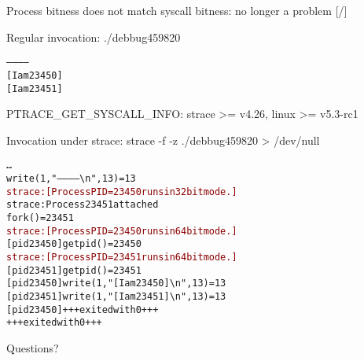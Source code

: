 \documentclass[unicode,aspectratio=169,xcolor={table,dvipsnames,usernames}]{beamer}
\begin{document}
\begin{frame}[fragile]{Process bitness does not match syscall bitness: no longer a problem \hfill [\insertframenumber/\inserttotalframenumber]}
\large
{}

\begin{block}{Regular invocation: ./debbug459820}
\begin{alltt}
------------
[I am 23450]
[I am 23451]
\end{alltt}
\end{block}
\end{frame}

\begin{frame}[fragile]{PTRACE\_GET\_SYSCALL\_INFO: strace >= v4.26, linux >= v5.3-rc1}
\large
\begin{block}{Invocation under strace: strace -f -z ./debbug459820 > /dev/null}
\begin{alltt}
\ldots
write(1, "------------{\textbackslash}n", 13)          = 13
\textcolor{darkred}{strace: [ Process PID=23450 runs in 32 bit mode. ]}
strace: Process 23451 attached
fork()                                  = 23451
\textcolor{darkred}{strace: [ Process PID=23450 runs in 64 bit mode. ]}
[pid 23450] getpid()                    = 23450
\textcolor{darkred}{strace: [ Process PID=23451 runs in 64 bit mode. ]}
[pid 23451] getpid()                    = 23451
[pid 23450] write(1, "[I am 23450]{\textbackslash}n", 13) = 13
[pid 23451] write(1, "[I am 23451]{\textbackslash}n", 13) = 13
[pid 23450] +++ exited with 0 +++
+++ exited with 0 +++
\end{alltt}
\end{block}
\end{frame}

{
\begin{frame}[noframenumbering]{Questions?}
	\begin{columns}
		\column{4cm}
			\centerline{}
		\column{3cm}
		\column{3cm}
			\centerline{}
	\end{columns}
\end{frame}
}
\end{document}

